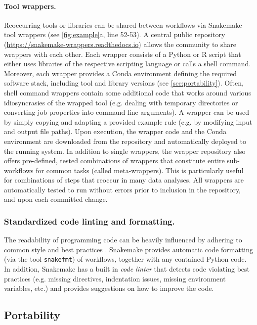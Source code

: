 \documentclass[10pt,a4paper,twocolumn]{article}
\let\plainurl\url
\renewcommand{\url}[1]{\protect\plainurl{#1}}
\begin{document}
\paragraph{Tool wrappers.}
Reoccurring tools or libraries can be shared between workflows via Snakemake tool wrappers (see \autoref{fig:example}a, line 52-53).
A central public repository (\url{https://snakemake-wrappers.readthedocs.io}) allows the community to share wrappers with each other.
Each wrapper consists of a Python or R script that either uses libraries of the respective scripting language or calls a shell command.
Moreover, each wrapper provides a Conda environment defining the required software stack, including tool and library versions (see \autoref{sec:portability}).
Often, shell command wrappers contain some additional code that works around various idiosyncrasies of the wrapped tool (e.g. dealing with temporary directories or converting job properties into command line arguments).
A wrapper can be used by simply copying and adapting a provided example rule (e.g. by modifying input and output file paths).
Upon execution, the wrapper code and the Conda environment are downloaded from the repository and automatically deployed to the running system.
In addition to single wrappers, the wrapper repository also offers pre-defined, tested combinations of wrappers that constitute entire sub-workflows for common tasks (called meta-wrappers).
This is particularly useful for combinations of steps that reoccur in many data analyses.
All wrappers are automatically tested to run without errors prior to inclusion in the repository, and upon each committed change.

\subsubsection{Standardized code linting and formatting.}\label{sec:style}

The readability of programming code can be heavily influenced by adhering to common style and best practices \parencite{tysell_sundkvist_code_2017}.
Snakemake provides automatic code formatting (via the tool \lstinline!snakefmt!) of workflows, together with any contained Python code.
In addition, Snakemake has a built in \emph{code linter} that detects code violating best practices (e.g. missing directives, indentation issues, missing environment variables, etc.) and provides suggestions on how to improve the code.

\subsection{Portability}\label{sec:portability}
\end{document}

